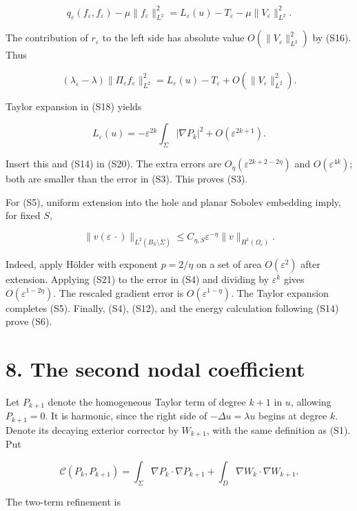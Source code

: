 \documentclass[11pt]{article}
\begin{document}
\[
 q_\varepsilon(f_\varepsilon,f_\varepsilon)
   -\mu\|f_\varepsilon\|_{L^2}^2
 = L_\varepsilon(u)-T_\varepsilon-\mu\|V_\varepsilon\|_{L^2}^2.
\]

The contribution of \(r_\varepsilon\) to the left side has absolute
value \(O(\|V_\varepsilon\|_{L^2}^2)\) by (S16). Thus

\[
 (\lambda_\varepsilon-\lambda)
       \|\Pi_\varepsilon f_\varepsilon\|_{L^2}^2
 =L_\varepsilon(u)-T_\varepsilon
       +O(\|V_\varepsilon\|_{L^2}^2).
 \tag{S20}
\]

Taylor expansion in (S18) yields

\[
 L_\varepsilon(u)
 =-\varepsilon^{2k}\int_\Sigma|\nabla P_k|^2
    +O(\varepsilon^{2k+1}).
\]

Insert this and (S14) in (S20). The extra errors are
\(O_\eta(\varepsilon^{2k+2-2\eta})\) and \(O(\varepsilon^{4k})\); both
are smaller than the error in (S3). This proves (S3).

For (S5), uniform extension into the hole and planar Sobolev embedding
imply, for fixed \(S\),

\[
 \|v(\varepsilon\,\cdot)\|_{L^2(B_S\setminus\overline\Sigma)}
 \le C_{\eta,S}\varepsilon^{-\eta}
             \|v\|_{H^1(\Omega_\varepsilon)}.
 \tag{S21}
\]

Indeed, apply Hölder with exponent \(p=2/\eta\) on a set of area
\(O(\varepsilon^2)\) after extension. Applying (S21) to the error in
(S4) and dividing by \(\varepsilon^k\) gives
\(O(\varepsilon^{1-2\eta})\). The rescaled gradient error is
\(O(\varepsilon^{1-\eta})\). The Taylor expansion completes (S5).
Finally, (S4), (S12), and the energy calculation following (S14) prove
(S6).

\section{8. The second nodal
coefficient}\label{the-second-nodal-coefficient}

Let \(P_{k+1}\) denote the homogeneous Taylor term of degree \(k+1\) in
\(u\), allowing \(P_{k+1}=0\). It is harmonic, since the right side of
\(-\Delta u=\lambda u\) begins at degree \(k\). Denote its decaying
exterior corrector by \(W_{k+1}\), with the same definition as (S1). Put

\[
 \mathcal C(P_k,P_{k+1})=
 \int_\Sigma\nabla P_k\cdot\nabla P_{k+1}
 +\int_D\nabla W_k\cdot\nabla W_{k+1}.
\]

The two-term refinement is
\end{document}
